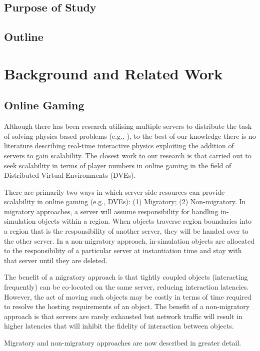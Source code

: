 \section{Purpose of Study}
\section{Outline}

\chapter{Background and Related Work}
\section{Online Gaming}
Although there has been research utilising multiple servers to distribute the task of solving physics based problems (e.g., \cite{mashayekhi2018automatically}), to the best of our knowledge there is no literature describing real-time interactive physics exploiting the addition of servers to gain scalability. The closest work to our research is that carried out to seek scalability in terms of player numbers in online gaming in the field of Distributed Virtual Environments (DVEs). 

There are primarily two ways in which server-side resources can provide scalability in online gaming (e.g., DVEs): (1) Migratory; (2) Non-migratory. In migratory approaches, a server will assume responsibility for handling in-simulation objects within a region. When objects traverse region boundaries into a region that is the responsibility of another server, they will be handed over to the other server. In a non-migratory approach, in-simulation objects are allocated to the responsibility of a particular server at instantiation time and stay with that server until they are deleted.

The benefit of a migratory approach is that tightly coupled objects (interacting frequently) can be co-located on the same server, reducing interaction latencies. However, the act of moving such objects may be costly in terms of time required to resolve the hosting requirements of an object. The benefit of a non-migratory approach is that servers are rarely exhausted but network traffic will result in higher latencies that will inhibit the fidelity of interaction between objects.

Migratory and non-migratory approaches are now described in greater detail.

